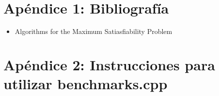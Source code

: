 \documentclass[a4paper,10pt]{article}
\begin{document}
\section*{Ap\'endice 1: Bibliograf\'ia}

\begin{itemize}
\item Algorithms for the Maximum Satiasfiability Problem 
\end{itemize}

\section*{Ap\'endice 2: Instrucciones para utilizar benchmarks.cpp}
\end{document}
